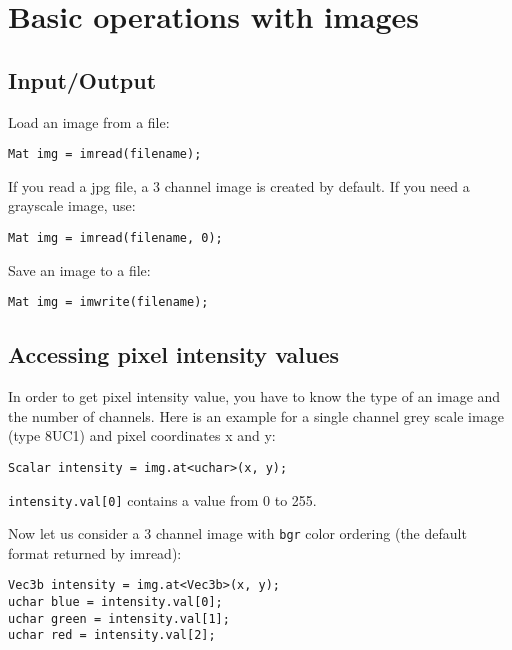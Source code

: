\section{Basic operations with images}


\ifCpp
\subsection{Input/Output}
Load an image from a file:
\begin{lstlisting}
Mat img = imread(filename);
\end{lstlisting}

If you read a jpg file, a 3 channel image is created by default. If you need a grayscale image, use:
\begin{lstlisting}
Mat img = imread(filename, 0);
\end{lstlisting}

Save an image to a file:
\begin{lstlisting}
Mat img = imwrite(filename);
\end{lstlisting}

\subsection{Accessing pixel intensity values}

In order to get pixel intensity value, you have to know the type of an image and the number of channels. Here is an example for a single channel grey scale image (type 8UC1) and pixel coordinates x and y:
\begin{lstlisting}
Scalar intensity = img.at<uchar>(x, y);
\end{lstlisting}
\texttt{intensity.val[0]} contains a value from 0 to 255. 

Now let us consider a 3 channel image with \texttt{bgr} color ordering (the default format returned by imread):
\begin{lstlisting}
Vec3b intensity = img.at<Vec3b>(x, y);
uchar blue = intensity.val[0];
uchar green = intensity.val[1];
uchar red = intensity.val[2];
\end{lstlisting}

